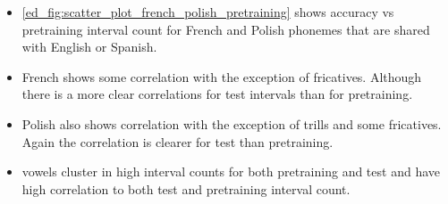 \begin{itemize}
    \item \ref{ed_fig:scatter_plot_french_polish_pretraining} shows accuracy vs pretraining interval count for French and Polish phonemes that are shared with English or Spanish.
    \item French shows some correlation with the exception of fricatives. Although there is a more clear correlations for test intervals than for pretraining.
    \item Polish also shows correlation with the exception of trills and some fricatives. Again the correlation is clearer for test than pretraining.
    \item vowels cluster in high interval counts for both pretraining and test and have high correlation to both test and pretraining interval count.
\end{itemize}

